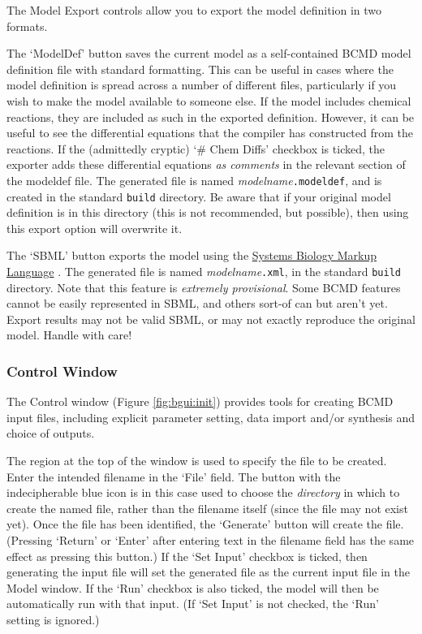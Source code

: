 \documentclass[a4paper,11pt]{article}
\begin{document}
The Model Export controls allow you to export the model definition in two formats.

The `ModelDef' button saves the current model as a self-contained BCMD model definition file with standard formatting. This can be useful in cases where the model definition is spread across a number of different files, particularly if you wish to make the model available to someone else. If the model includes chemical reactions, they are included as such in the exported definition. However, it can be useful to see the differential equations that the compiler has constructed from the reactions. If the (admittedly cryptic) `\# Chem Diffs' checkbox is ticked, the exporter adds these differential equations \textit{as comments} in the relevant section of the modeldef file. The generated file is named \textit{modelname}\texttt{.modeldef}, and is created in the standard \texttt{build} directory. Be aware that if your original model definition is in this directory (this is not recommended, but possible), then using this export option will overwrite it.

The `SBML' button exports the model using the \href{http://sbml.org}{Systems Biology Markup Language} \citep{Hucka:2003fs,Finney:2003wp}. The generated file is named \textit{modelname}\texttt{.xml}, in the standard \texttt{build} directory. Note that this feature is \textit{extremely provisional}. Some BCMD features cannot be easily represented in SBML, and others sort-of can but aren't yet. Export results may not be valid SBML, or may not exactly reproduce the original model. Handle with care!

\subsubsection{Control Window}\label{bgui:control}

The Control window (Figure \ref{fig:bgui:init}) provides tools for creating BCMD input files, including explicit parameter setting, data import and/or synthesis and choice of outputs.

The region at the top of the window is used to specify the file to be created. Enter the intended filename in the `File' field. The button with the indecipherable blue icon is in this case used to choose the \textit{directory} in which to create the named file, rather than the filename itself (since the file may not exist yet). Once the file has been identified, the `Generate' button will create the file. (Pressing `Return' or `Enter' after entering text in the filename field has the same effect as pressing this button.) If the `Set Input' checkbox is ticked, then generating the input file will set the generated file as the current input file in the Model window. If the `Run' checkbox is also ticked, the model will then be automatically run with that input. (If `Set Input' is not checked, the `Run' setting is ignored.)
\end{document}
